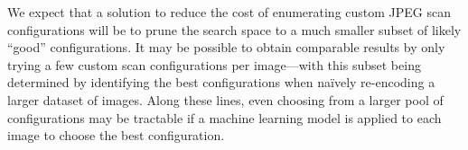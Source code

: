 We expect that a solution to reduce the cost of enumerating custom JPEG scan configurations will be to prune the search space to a much smaller subset of likely ``good'' configurations.
It may be possible to obtain comparable results by only trying a few custom scan
configurations per image---with this subset being determined by identifying the best configurations when na\"{i}vely re-encoding a larger dataset of images.
Along these lines, even choosing from a larger pool of configurations may be tractable if a machine learning model is applied to each image to choose the best configuration.

